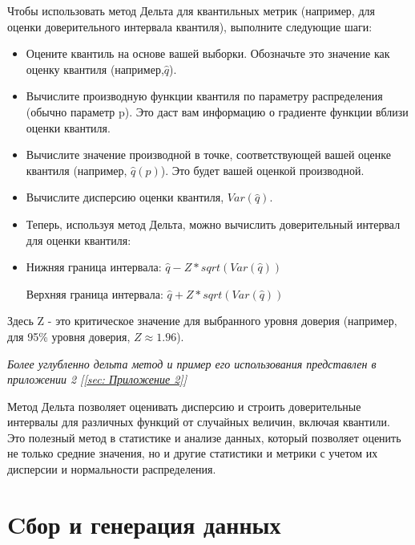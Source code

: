\documentclass[specialist,
               substylefile = spbu_report.rtx,
               subf,href,colorlinks=true, 12pt]{disser}
\begin{document}
Чтобы использовать метод Дельта для квантильных метрик (например, для оценки доверительного интервала квантиля), выполните следующие шаги:

\begin{itemize}
\item Оцените квантиль на основе вашей выборки. Обозначьте это значение как оценку квантиля (например,$ \widehat{q}$).
\item Вычислите производную функции квантиля по параметру распределения (обычно параметр p). Это даст вам информацию о градиенте функции вблизи оценки квантиля.
\item Вычислите значение производной в точке, соответствующей вашей оценке квантиля (например, $\widehat{q}(p)$). Это будет вашей оценкой производной.
\item Вычислите дисперсию оценки квантиля, $Var(\widehat{q})$.
\item Теперь, используя метод Дельта, можно вычислить доверительный интервал для оценки квантиля:
\item 
    Нижняя граница интервала: $\widehat{q} - Z * sqrt(Var(\widehat{q}))$

    Верхняя граница интервала: $\widehat{q} + Z * sqrt(Var(\widehat{q}))$
\end{itemize}
Здесь Z - это критическое значение для выбранного уровня доверия (например, для 95\% уровня доверия, $Z  \approx 1.96$).

 \textit{Более углубленно дельта метод и пример его использования представлен в приложении 2 [\ref{sec: Приложение 2}]}

Метод Дельта позволяет оценивать дисперсию и строить доверительные интервалы для различных функций от случайных величин, включая квантили. Это полезный метод в статистике и анализе данных, который позволяет оценить не только средние значения, но и другие статистики и метрики с учетом их дисперсии и нормальности распределения.



\newpage
\section{Cбор и генерация данных}
\end{document}

